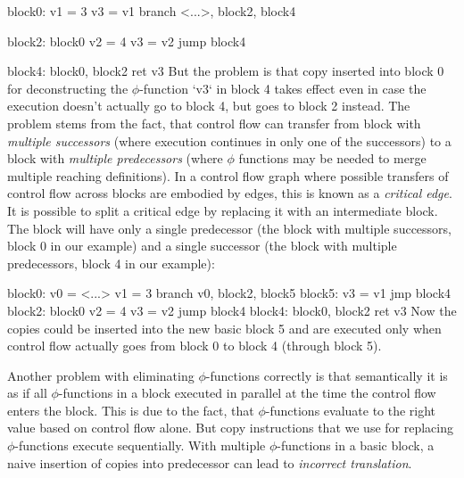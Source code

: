 \begtt \optparams
block0:
    v1 = 3
    v3 = v1
    branch <...>, block2, block4

block2: block0
    v2 = 4
    v3 = v2
    jump block4

block4: block0, block2
    ret v3
\endtt
%
But the problem is that copy inserted into block 0 for deconstructing the
$\phi$-function `v3` in block 4 takes effect even in case the execution doesn't
actually go to block 4, but goes to block 2 instead. The problem stems from the
fact, that control flow can transfer from block with {\em multiple successors} (where
execution continues in only one of the successors) to a block with {\em multiple
predecessors} (where $\phi$ functions may be needed to merge multiple reaching
definitions). In a control flow graph where possible transfers of control flow
across blocks are embodied by edges, this is known as a {\em critical edge}.
It is possible to split a critical edge by replacing it with an intermediate
block. The block will have only a single predecessor (the block with multiple
successors, block 0 in our example) and a single successor (the block with
multiple predecessors, block 4 in our example):

\begtt \optparams
block0:
    v0 = <...>
    v1 = 3
    branch v0, block2, block5
block5:
    v3 = v1
    jmp block4
block2: block0
    v2 = 4
    v3 = v2
    jump block4
block4: block0, block2
    ret v3
\endtt
%
Now the copies could be inserted into the new basic block 5 and are executed only
when control flow actually goes from block 0 to block 4 (through block 5).

Another problem with eliminating $\phi$-functions correctly is that semantically
it is as if all $\phi$-functions in a block executed in parallel at the time the
control flow enters the block. This is due to the fact, that $\phi$-functions
evaluate to the right value based on control flow alone. But copy instructions that
we use for replacing $\phi$-functions execute sequentially. With multiple
$\phi$-functions in a basic block, a naive insertion of copies into predecessor
can lead to {\em incorrect translation}.


